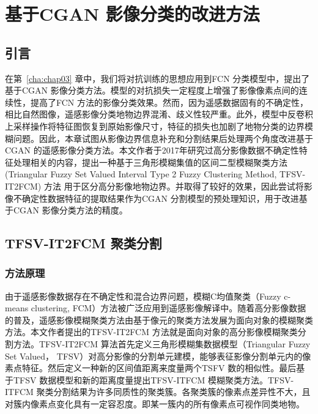 
\chapter{基于CGAN 影像分类的改进方法}
\label{cha:chap04}

\section{引言}
\label{sec:chap04-1}
在第~\ref{cha:chap03} 章中，我们将对抗训练的思想应用到FCN 分类模型中，提出了基于CGAN 影像分类方法。模型的对抗损失一定程度上增强了影像像素点间的连续性，提高了FCN 方法的影像分类效果。然而，因为遥感数据固有的不确定性，相比自然图像，遥感影像分类地物边界混淆、歧义性较严重。此外，模型中反卷积上采样操作将特征图恢复到原始影像尺寸，特征的损失也加剧了地物分类的边界模糊问题。因此，本章试图从影像边界信息补充和分割结果后处理两个角度改进基于CGAN 的遥感影像分类方法。本文作者于2017年研究过高分影像数据不确定性特征处理相关的内容，提出一种基于三角形模糊集值的区间二型模糊聚类方法(Triangular Fuzzy Set Valued Interval Type 2 Fuzzy Clustering Method, TFSV-IT2FCM) 方法\cite{jiang2018enhanced} 用于区分高分影像地物边界。并取得了较好的效果，因此尝试将影像不确定性数据特征的提取结果作为CGAN 分割模型的预处理知识，用于改进基于CGAN 影像分类方法的精度。


\section{TFSV-IT2FCM 聚类分割}
\label{sec:chap04-2}

\subsection{方法原理}
\label{subsec:chap04-2-1}
由于遥感影像数据存在不确定性和混合边界问题，模糊C均值聚类（Fuzzy c-means clustering, FCM）方法被广泛应用到遥感影像解译中\cite{bezdek1984fcm}。随着高分影像数据的普及，遥感影像模糊聚类方法由基于像元的聚类方法发展为面向对象的模糊聚类方法。本文作者提出的TFSV-IT2FCM 方法就是面向对象的高分影像模糊聚类分割方法。TFSV-IT2FCM 算法首先定义三角形模糊集数据模型（Triangular Fuzzy Set Valued， TFSV）对高分影像的分割单元建模，能够表征影像分割单元内的像素点特征。然后定义一种新的区间值距离来度量两个TSFV 数的相似性。最后基于TFSV 数据模型和新的距离度量提出TFSV-ITFCM 模糊聚类方法。TFSV-ITFCM 聚类分割结果为许多同质性的聚类簇。各聚类簇的像素点差异性不大，且对簇内像素点变化具有一定容忍度。即某一簇内的所有像素点可视作同类地物。

